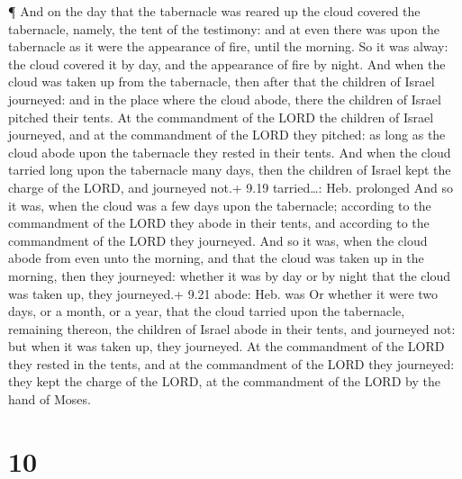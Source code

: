  ¶ And on the day that the tabernacle was reared up the
cloud covered the tabernacle, namely, the tent of the testimony: and at
even there was upon the tabernacle as it were the appearance of fire,
until the morning.  So it was alway: the cloud covered it
by day, and the appearance of fire by night.  And when the
cloud was taken up from the tabernacle, then after that the children of
Israel journeyed: and in the place where the cloud abode, there the
children of Israel pitched their tents.  At the commandment
of the LORD the children of Israel journeyed, and at the commandment of
the LORD they pitched: as long as the cloud abode upon the tabernacle
they rested in their tents.  And when the cloud tarried
long upon the tabernacle many days, then the children of Israel kept the
charge of the LORD, and journeyed not.+ 9.19 tarried\ldots: Heb.
prolonged  And so it was, when the cloud was a few days
upon the tabernacle; according to the commandment of the LORD they abode
in their tents, and according to the commandment of the LORD they
journeyed.  And so it was, when the cloud abode from even
unto the morning, and that the cloud was taken up in the morning, then
they journeyed: whether it was by day or by night that the cloud was
taken up, they journeyed.+ 9.21 abode: Heb. was  Or whether
it were two days, or a month, or a year, that the cloud tarried upon the
tabernacle, remaining thereon, the children of Israel abode in their
tents, and journeyed not: but when it was taken up, they journeyed.
 At the commandment of the LORD they rested in the tents,
and at the commandment of the LORD they journeyed: they kept the charge
of the LORD, at the commandment of the LORD by the hand of Moses.

\hypertarget{section-9}{%
\section{10}\label{section-9}}

